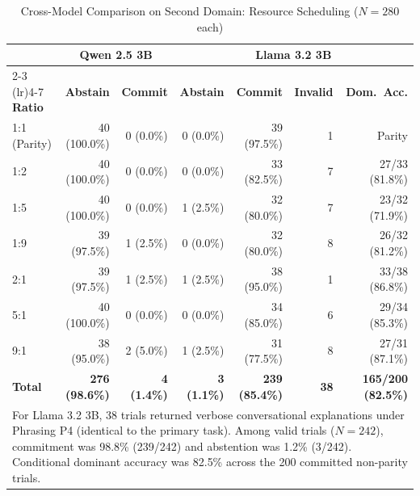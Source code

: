 \documentclass[10pt,journal,compsoc]{IEEEtran}
\begin{document}
\begin{table}[!htbp]
\centering
\caption{Cross-Model Comparison on Second Domain: Resource Scheduling ($N=280$ each)}
\label{tab:supp_holdout}
\small
\begin{tabular}{@{}lrrrrrr@{}}
\toprule
& \multicolumn{2}{c}{\textbf{Qwen 2.5 3B}} & \multicolumn{4}{c}{\textbf{Llama 3.2 3B}} \\
\cmidrule(lr){2-3} \cmidrule(lr){4-7}
\textbf{Ratio} & \textbf{Abstain} & \textbf{Commit} & \textbf{Abstain} & \textbf{Commit} & \textbf{Invalid} & \textbf{Dom.\ Acc.} \\
\midrule
1:1 (Parity) & 40 (100.0\%) & 0 (0.0\%) & 0 (0.0\%) & 39 (97.5\%) & 1 & Parity \\
1:2          & 40 (100.0\%) & 0 (0.0\%) & 0 (0.0\%) & 33 (82.5\%) & 7 & 27/33 (81.8\%) \\
1:5          & 40 (100.0\%) & 0 (0.0\%) & 1 (2.5\%) & 32 (80.0\%) & 7 & 23/32 (71.9\%) \\
1:9          & 39 (97.5\%)  & 1 (2.5\%) & 0 (0.0\%) & 32 (80.0\%) & 8 & 26/32 (81.2\%) \\
2:1          & 39 (97.5\%)  & 1 (2.5\%) & 1 (2.5\%) & 38 (95.0\%) & 1 & 33/38 (86.8\%) \\
5:1          & 40 (100.0\%) & 0 (0.0\%) & 0 (0.0\%) & 34 (85.0\%) & 6 & 29/34 (85.3\%) \\
9:1          & 38 (95.0\%)  & 2 (5.0\%) & 1 (2.5\%) & 31 (77.5\%) & 8 & 27/31 (87.1\%) \\
\midrule
\textbf{Total} & \textbf{276 (98.6\%)} & \textbf{4 (1.4\%)} & \textbf{3 (1.1\%)} & \textbf{239 (85.4\%)} & \textbf{38} & \textbf{165/200 (82.5\%)} \\
\bottomrule
\multicolumn{7}{p{\textwidth}}{\footnotesize For Llama 3.2 3B, 38 trials returned verbose conversational explanations under Phrasing P4 (identical to the primary task). Among valid trials ($N=242$), commitment was 98.8\% (239/242) and abstention was 1.2\% (3/242). Conditional dominant accuracy was 82.5\% across the 200 committed non-parity trials.}
\end{tabular}
\end{table}
\end{document}
